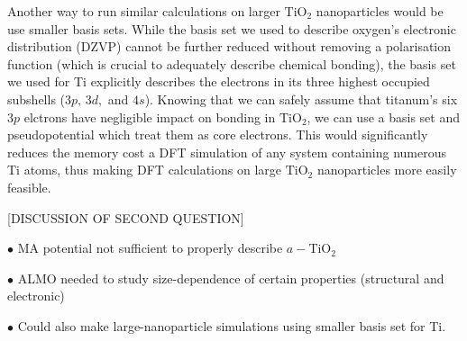 \documentclass[aps,prb,twocolumn,amsmath,amssymb,superscriptaddress,longbibliography]{revtex4-1}
\newcommand\tab[1][1cm]{\hspace*{#1}} %
\begin{document}
\tab Another way to run similar calculations on larger $\text{TiO}_2$ nanoparticles would be use smaller basis sets.
While the basis set we used to describe oxygen's electronic distribution (DZVP) cannot be further reduced without removing a polarisation function (which is crucial to adequately describe chemical bonding), the basis set we used for Ti explicitly describes the electrons in its three highest occupied subshells ($3p,\,3d,$ and $4s$).
Knowing that we can safely assume that titanum's six $3p$ elctrons have negligible impact on bonding in $\text{TiO}_2$, we can use a basis set and pseudopotential which treat them as core electrons.
This would significantly reduces the memory cost a DFT simulation of any system containing numerous Ti atoms, thus making DFT calculations on large $\text{TiO}_2$ nanoparticles more easily feasible.

[DISCUSSION OF SECOND QUESTION]


$\bullet$ MA potential not sufficient to properly describe $a-\text{TiO}_2$

$\bullet$ ALMO needed to study size-dependence of certain properties (structural and electronic)

$\bullet$ Could also make large-nanoparticle simulations using smaller basis set for Ti. 
\end{document}
